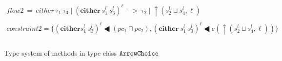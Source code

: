 \documentclass{report}
\newcommand{\co}[1]{$\cod{#1}$}
\newcommand{\sts}[1]{s_{#1}^l}
\newcommand{\sleql}{\LHD}
\newcommand{\tagup}{\uparrow}
\newcommand{\typn}[1]{\tau_{#1}}
\newcommand{\res}[2]{{#1}\mid {#2}}
\begin{document}
\begin{figure}[t]
\[\begin{array}{c}
    flow2~=~\res{either\ \typn{1}\ \typn{3}}{(\mathbf{either}\ \sts{1}\ \sts{3})^\ell}~->~
            \res{\typn{2}}{\tagup (\sts{2}\sqcup \sts{4},\ell)} \\ \\

    constraint2 = \{(\mathbf{either} \sts{1}\ \sts{3})^\ell\sleql (pc_1\sqcap pc_2),
                   (\mathbf{either}\ \sts{1}\ \sts{3})^\ell\sleql e(\tagup (\sts{2}\sqcup \sts{4},\ell)) \} \\ \\
%
    \end{array}
  \]
\caption{Type system of methods in type class \co{ArrowChoice}}
\label{fig:flowarrowref:typesystem1}
\end{figure}
\end{document}
